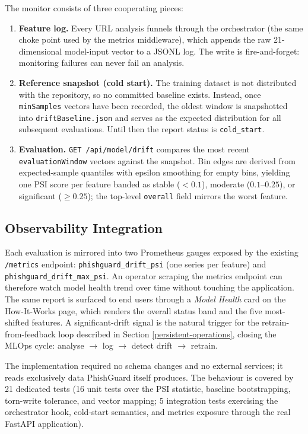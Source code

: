 The monitor consists of three cooperating pieces:

\begin{enumerate}
  \item \textbf{Feature log.} Every URL analysis funnels through the
  orchestrator (the same choke point used by the metrics middleware), which
  appends the raw 21-dimensional model-input vector to a JSONL log. The
  write is fire-and-forget: monitoring failures can never fail an analysis.
  \item \textbf{Reference snapshot (cold start).} The training dataset is
  not distributed with the repository, so no committed baseline exists.
  Instead, once \texttt{minSamples} vectors have been recorded, the oldest
  window is snapshotted into \texttt{driftBaseline.json} and serves as the
  expected distribution for all subsequent evaluations. Until then the
  report status is \texttt{cold\_start}.
  \item \textbf{Evaluation.} \texttt{GET /api/model/drift} compares the most
  recent \texttt{evaluationWindow} vectors against the snapshot. Bin edges
  are derived from expected-sample quantiles with epsilon smoothing for
  empty bins, yielding one PSI score per feature banded as stable ($<0.1$),
  moderate ($0.1$--$0.25$), or significant ($\geq 0.25$); the top-level
  \texttt{overall} field mirrors the worst feature.
\end{enumerate}

\subsection{Observability Integration}

Each evaluation is mirrored into two Prometheus gauges exposed by the
existing \texttt{/metrics} endpoint: \texttt{phishguard\_drift\_psi} (one
series per feature) and \texttt{phishguard\_drift\_max\_psi}. An operator
scraping the metrics endpoint can therefore watch model health trend over
time without touching the application. The same report is surfaced to end
users through a \emph{Model Health} card on the How-It-Works page, which
renders the overall status band and the five most-shifted features. A significant-drift signal is the
natural trigger for the retrain-from-feedback loop described in Section
\ref{persistent-operations}, closing the MLOps cycle: analyse $\rightarrow$
log $\rightarrow$ detect drift $\rightarrow$ retrain.

The implementation required no schema changes and no external services;
it reads exclusively data PhishGuard itself produces. The behaviour is
covered by 21 dedicated tests (16 unit tests over the PSI statistic,
baseline bootstrapping, torn-write tolerance, and vector mapping; 5
integration tests exercising the orchestrator hook, cold-start semantics,
and metrics exposure through the real FastAPI application).

